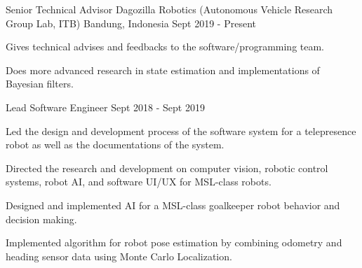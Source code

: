 

\begin{cventries}

    \cventry
    {Senior Technical Advisor} %
    {Dagozilla Robotics (Autonomous Vehicle Research Group Lab, ITB)} %
    {Bandung, Indonesia} %
    {Sept 2019 - Present} %
    {
        \begin{cvitems} %
            \item {Gives technical advises and feedbacks to the software/programming team.}
            \item {Does more advanced research in state estimation and implementations of Bayesian filters.}
        \end{cvitems}
    }

  \cventry
	{Lead Software Engineer} %
	{} %
	{} %
	{Sept 2018 - Sept 2019} %
	{
	  \begin{cvitems} %
	  	\item {Led the design and development process of the software system for a telepresence robot as well as the documentations of the system.}
		\item {Directed the research and development on computer vision, robotic control systems, robot AI, and software UI/UX for MSL-class robots.}
		\item {Designed and implemented AI for a MSL-class goalkeeper robot behavior and decision making.}
		\item {Implemented algorithm for robot pose estimation by combining odometry and heading sensor data using Monte Carlo Localization.}
	  \end{cvitems}
	}


\end{cventries}
